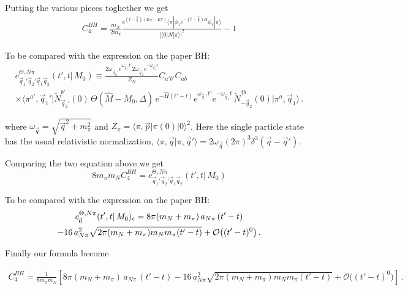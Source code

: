 \documentclass[10pt,a4paper]{article}
\begin{document}
Putting the various pieces toghether we get
\begin{gather}
C_4^{BH}=\frac{m_N}{ 2 m_\pi }\frac{
  e^{ (t-\frac{T}{8})(E_N-E\pi)} \langle \pi|   \phi_1 e^{-(t-\frac{T}{8})H}\phi_1 
 | \pi\rangle  
}{
 |\langle 0| N | \pi\rangle|^2  
}-1
\end{gather}
\begin{tcolorbox}
{To be compared with the expression on the  paper BH:
 \begin{multline}
\label{eq:cThetaNpiDef}
c^{\Theta, N \pi}_{\vec q_1' \vec q_2' \vec q_1 \vec q_2}(t', t \vert \, M_0) \equiv \frac{ 2 \omega_{\vec q_2'} e^{\omega_{\vec q_2'} t' } 2 \omega_{\vec q_2 } e^{- \omega_{\vec q_2 } t } }{Z_N} C_{a'b'} C_{ab} \, \\
\times \langle \pi^{a'} , \vec q_1' \vert \widetilde N^{b'}_{ \vec q_2'}(0) \, \Theta(\hat M - M_0, \Delta) \, e^{- \hat H(t' - t)} e^{ \omega_{\vec q_1'} t'} e^{ - \omega_{\vec q_1} t} \, \widetilde N^{\dagger b}_{-\vec q_2}(0) \vert \pi^{a}, \vec q_1 \rangle \,.
\nonumber
\end{multline}
}
\end{tcolorbox}

\begin{tcolorbox}
where $\omega_{\vec q} = \sqrt{\vec q^2 + m_\pi^2}$ and $Z_\pi = \langle \pi, \vec p \vert \pi(0) \vert 0 \rangle^2$. Here the single particle state has the usual relativistic normalization, $\langle \pi, \vec q \vert \pi, \vec q' \rangle = 2 \omega_{\vec q} (2 \pi)^3 \delta^3(\vec q - \vec q')$.
\end{tcolorbox}
Comparing the two equation above we get 
\begin{equation}
8m_\pi m_N C_4^{BH}=  c^{\Theta, N \pi}_{\vec q_1' \vec q_2' \vec q_1 \vec q_2}(t', t \vert \, M_0)
\end{equation}
 
 \begin{tcolorbox}
 To be compared with the expression on the  paper BH:
 \begin{multline}
c^{\Theta, N \pi}_{\vec 0}(t', t \vert \, M_0) _{\sf c} = 8 \pi (m_N + m_\pi) \, a_{N\pi} \, (t' - t ) \\
- 16 \, a_{N \pi}^2 \sqrt{2 \pi (m_N + m_\pi) m_N m_\pi (t'-t)} + \mathcal O \big ((t'-t)^0\big) \,.\nonumber
\end{multline}
 \end{tcolorbox}
Finally our formula become 

\begin{multline}
 C_4^{BH}=  \frac{1}{8m_\pi m_N}\left[ 8 \pi (m_N + m_\pi) \, a_{N\pi} \, (t' - t ) 
- 16 \, a_{N \pi}^2 \sqrt{2 \pi (m_N + m_\pi) m_N m_\pi (t'-t)} + \mathcal O \big ((t'-t)^0\big) \right]\,.\nonumber
\end{multline} 
 
 
 
 
 
\end{document}
